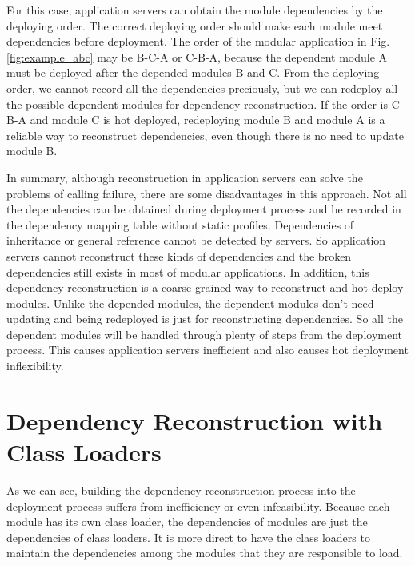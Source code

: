 \documentclass[conference]{IEEEtran}
\begin{document}
For this case, application servers can obtain the module dependencies by the deploying order. The correct deploying order should make each module meet dependencies before deployment. The order of the modular application in Fig. \ref{fig:example_abc} may be B-C-A or C-B-A, because the dependent module A must be deployed after the depended modules B and C. From the deploying order, we cannot record all the dependencies preciously, but we can redeploy all the possible dependent modules for dependency reconstruction. If the order is C-B-A and module C is hot deployed, redeploying module B and module A is a reliable way to reconstruct dependencies, even though there is no need to update module B.

In summary, although reconstruction in application servers can solve the problems of calling failure, there are some disadvantages in this approach.
Not all the dependencies can be obtained during deployment process and be recorded in the dependency mapping table without static profiles.
Dependencies of inheritance or general reference cannot be detected by servers.
So application servers cannot reconstruct these kinds of dependencies and the broken dependencies still exists in most of modular applications.
In addition, this dependency reconstruction is a coarse-grained way to reconstruct and hot deploy modules.
Unlike the depended modules, the dependent modules don't need updating and being redeployed is just for reconstructing dependencies.
So all the dependent modules will be handled through plenty of steps from the deployment process.
This causes application servers inefficient and also causes hot deployment inflexibility.


 
 
\section{Dependency Reconstruction with Class Loaders\label{sec:reconstructionCL}}

As we can see, building the dependency reconstruction process into the deployment process suffers from inefficiency or even infeasibility. 
Because each module has its own class loader, the dependencies of modules are just the dependencies of class loaders. 
It is more direct to have the class loaders to maintain the dependencies among the modules that they are responsible to load. 
\end{document}
